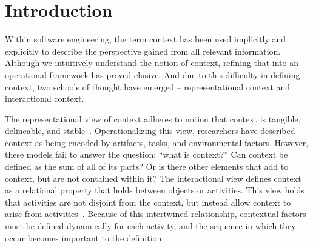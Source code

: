 
\section{Introduction}







Within software engineering, the term context has been used implicitly and explicitly to describe the perspective gained from all relevant information. Although we intuitively understand the notion of context, refining that into an operational framework has proved elusive. And due to this difficulty in defining context, two schools of thought have emerged -- representational context and interactional context.

The representational view of context adheres to notion that context is tangible, delineable, and stable~\cite{Dourish:2004,Schilit:1994a,Abowd:1999,Pascoe:1998}. Operationalizing this view, researchers have described context as being encoded by artifacts, tasks, and environmental factors. However, these models fail to answer the question: ``what is context?'' Can context be defined as the sum of all of its parts? Or is there other elements that add to context, but are not contained within it?
The interactional view defines context as a relational property that holds between objects or activities. This view holds that activities are not disjoint from the context, but instead allow context to arise from activities~\cite{Dourish:2004}. Because of this intertwined relationship, contextual factors must be defined dynamically for each activity, and the sequence in which they occur becomes important to the definition~\cite{Viriyakattiyaporn:2010}.

